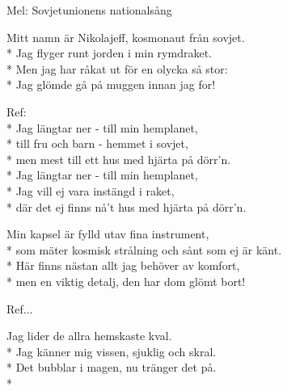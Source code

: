 \begin{SongText}
    \begin{SongInfo}
        Mel: Sovjetunionens nationalsång
    \end{SongInfo}
    \begin{SongVerse}
        Mitt namn är Nikolajeff, kosmonaut från sovjet.\\*%
        Jag flyger runt jorden i min rymdraket.\\*%
        Men jag har råkat ut för en olycka så stor:\\*%
        Jag glömde gå på muggen innan jag for!
    \end{SongVerse}
    \begin{SongVerse}
        Ref:\\*%
        Jag längtar ner - till min hemplanet,\\*%
        till fru och barn - hemmet i sovjet,\\*%
        men mest till ett hus med hjärta på dörr’n.\\*%
        Jag längtar ner - till min hemplanet,\\*%
        Jag vill ej vara instängd i raket,\\*%
        där det ej finns nå’t hus med hjärta på dörr’n.
    \end{SongVerse}
    \begin{SongVerse}
        Min kapsel är fylld utav fina instrument,\\*%
        som mäter kosmisk strålning och sånt som ej är känt.\\*%
        Här finns nästan allt jag behöver av komfort,\\*%
        men en viktig detalj, den har dom glömt bort!
    \end{SongVerse}
    \begin{SongVerse}
        Ref...
    \end{SongVerse}
    \begin{SongVerse}
        Jag lider de allra hemskaste kval.\\*%
        Jag känner mig vissen, sjuklig och skral.\\*%
        Det bubblar i magen, nu tränger det på.\\*%

\end{SongVerse}
\end{SongText}
